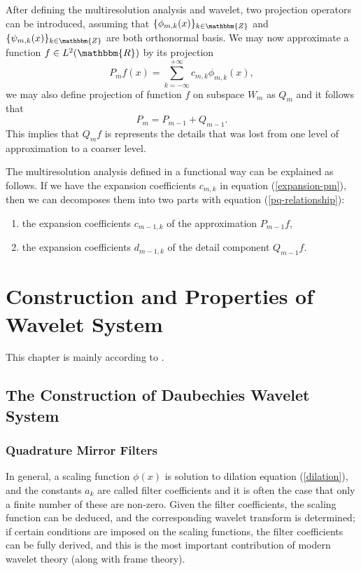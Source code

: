 \documentclass{book}
\newenvironment{enumeratenumeric}{\begin{enumerate}[1.] }{\end{enumerate}}
\begin{document}
After defining the multiresolution analysis and wavelet, two projection
operators can be introduced, assuming that $\{ \phi_{m, k} (x) \}_{k \in
\mathbbm{Z}}$ and $\{ \psi_{m, k} (x) \}_{k \in \mathbbm{Z}}$ are both
orthonormal basis. We may now approximate a function $f \in L^2 (\mathbbm{R})$
by its projection
\begin{equation}
  P_m f (x) = \sum_{k = - \infty}^{+ \infty} c_{m, k} \phi_{m, k} (x),
  \label{expansion-pm}
\end{equation}
we may also define projection of function $f$ on subspace $W_m$ as $Q_m$ and
it follows that
\begin{equation}
  P_m = P_{m - 1} + Q_{m - 1} . \label{pq-relationship}
\end{equation}
This implies that $Q_m f$ is represents the details that was lost from one
level of approximation to a coarser level.

The multiresolution analysis defined in a functional way can be explained as
follows. If we have the expansion coefficients $c_{m, k}$ in equation
(\ref{expansion-pm}), then we can decomposes them into two parts with equation
(\ref{pq-relationship}):
\begin{enumeratenumeric}
  \item the expansion coefficients $c_{m - 1, k}$ of the approximation $P_{m -
  1} f$,
  
  \item the expansion coefficients $d_{m - 1, k}$ of the detail component
  $Q_{m - 1} f.$
\end{enumeratenumeric}

\chapter{Construction and Properties of Wavelet System}

This chapter is mainly according to {\cite{williams1994introduction}}.

\section{The Construction of Daubechies Wavelet System}

\subsection{Quadrature Mirror Filters}

In general, a scaling function $\phi (x)$ is solution to dilation equation
(\ref{dilation}), and the constants $a_k$ are called filter coefficients and
it is often the case that only a finite number of these are non-zero. Given
the filter coefficients, the scaling function can be deduced, and the
corresponding wavelet transform is determined; if certain conditions are
imposed on the scaling functions, the filter coefficients can be fully
derived, and this is the most important contribution of modern wavelet theory
(along with frame theory).
\end{document}

